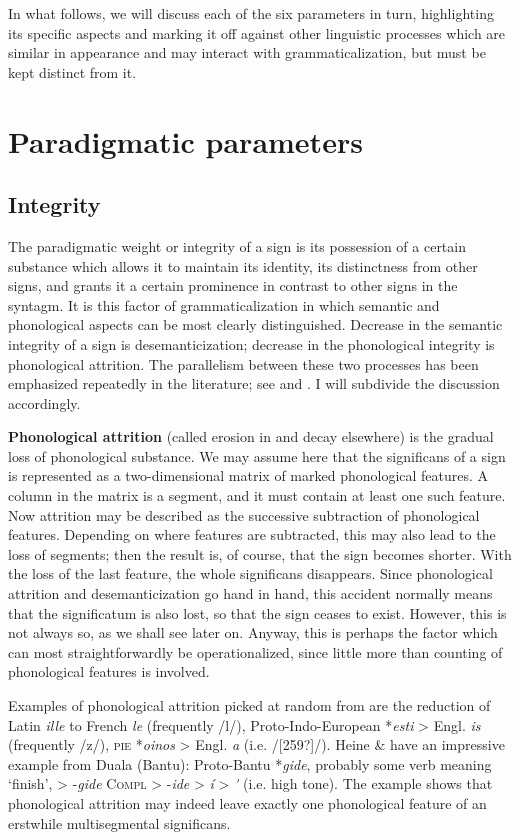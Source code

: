 In what follows, we will discuss each of the six parameters in turn, highlighting its specific aspects and marking it off against other linguistic processes which are similar in appearance and may interact with grammaticalization, but must be kept distinct from it.

\section{Paradigmatic parameters}
\subsection{Integrity}

The paradigmatic weight or integrity of a sign is its possession of a certain substance which allows it to maintain its identity, its distinctness from other signs, and grants it a certain prominence in contrast to other signs in the syntagm. It is this factor of grammaticalization in which semantic and phonological aspects can be most clearly distinguished. Decrease in the semantic integrity of a sign is desemanticization; decrease in the phonological integrity is phonological attrition. The parallelism between these two processes has been emphasized repeatedly in the literature; see \citet[135-139 ]{Meillet1912} and \citet[114-119]{Lehmann1974}. I will subdivide the discussion accordingly.

\textbf{Phonological attrition} (called erosion in \citet[21ff ]{HeineEtAl1984} and decay elsewhere) is the gradual loss of phonological substance. We may assume here that the significans of a sign is represented as a two-dimensional matrix of marked phonological features. A column in the matrix is a segment, and it must contain at least one such feature. Now attrition may be described as the successive subtraction of phonological features. Depending on where features are subtracted, this may also lead to the loss of segments; then the result is, of course, that the sign becomes shorter. With the loss of the last feature, the whole significans disappears. Since phonological attrition and desemanticization go hand in hand, this accident normally means that the significatum is also lost, so that the sign ceases to exist. However, this is not always so, as we shall see later on. Anyway, this is perhaps the factor which can most straightforwardly be operationalized, since little more than counting of phonological features is involved.

Examples of phonological attrition picked at random from  are the reduction of Latin \textit{ille} to French \textit{le} (frequently /l/), Proto-Indo-European *\textit{esti} {\textgreater} Engl. \textit{is} (frequently /z/), \textsc{pie} *\textit{oinos} {\textgreater} Engl. \textit{a} (i.e. /[259?]/). Heine \& \citet[25]{Reh1984} have an impressive example from Duala (Bantu): Proto-Bantu *\textit{gide}, probably some verb meaning ‘finish’, {\textgreater} -\textit{gide} \textsc{Compl} {\textgreater} -\textit{ide} {\textgreater} \textit{í} {\textgreater} \textit{\'{ }} (i.e. high tone). The example shows that phonological attrition may indeed leave exactly one phonological feature of an erstwhile multisegmental significans.

